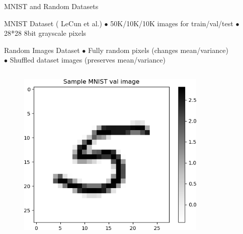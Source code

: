 \documentclass{beamer}
\begin{document}
\begin{frame}{MNIST and Random Datasets}
    \begin{block}{MNIST Dataset \tiny{(\cite{lecun-mnisthandwrittendigit-2010} LeCun et al.)} }
    $\bullet$ 50K/10K/10K images for train/val/test $\bullet$ 28*28 8bit grayscale pixels\\ 
    \end{block}
    \begin{block}{Random Images Dataset}
    $\bullet$ Fully random pixels (changes mean/variance)\\
    $\bullet$ Shuffled dataset images (preserves mean/variance) 
    \end{block}
    
    \begin{columns}
    \begin{column}{.33\textwidth}
    \begin{figure}
        \centering
        \includegraphics[width=.99\textwidth]{images/mnist-behavior/Sample-MNIST.png}
    \end{figure}
    \end{column}
    \begin{column}{.33\textwidth}
    \begin{figure}
        \centering

\end{figure}
\end{column}
\end{columns}
\end{frame}
\end{document}
